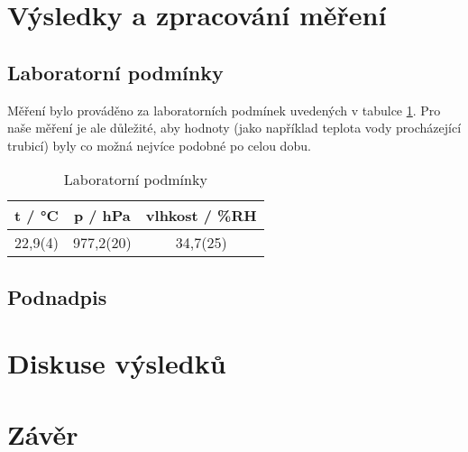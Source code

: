 \section{Výsledky a zpracování měření}

\subsection{Laboratorní podmínky}

    Měření bylo prováděno za laboratorních podmínek uvedených v tabulce \ref{tab:lab_pod}. Pro naše měření je ale důležité, aby hodnoty (jako například teplota vody procházející  trubicí) byly co možná nejvíce podobné po celou dobu.

    \begin{table}[h]
        \centering
        \begin{tabular}{|c|c|c|} 
        \hline
            t / °C & p / hPa & vlhkost / \%RH  \\ 
        \hline
            22,9(4)   & 977,2(20)   & 34,7(25)            \\
        \hline
        \end{tabular}
        \caption{Laboratorní podmínky}
        \label{tab:lab_pod}
    \end{table}

\subsection{Podnadpis}

    
\section{Diskuse výsledků}

\section{Závěr}
